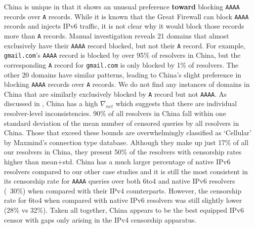 China is unique in that it shows an unusual preference \textbf{toward} blocking
\texttt{AAAA} records over \texttt{A} records. While it is known that the Great
Firewall can block \texttt{AAAA} records and injects IPv6 traffic, it is not
clear why it would block those records more than \texttt{A} records. Manual
investigation reveals 21 domains that almost exclusively have their
\texttt{AAAA} record blocked, but not their \texttt{A} record. For example,
\texttt{gmail.com}'s \texttt{AAAA} record is blocked by over 95\% of resolvers
in China, but the corresponding \texttt{A} record for \texttt{gmail.com} is
only blocked by 1\% of resolvers. The other 20 domains have similar patterns,
leading to China's slight preference in blocking \texttt{AAAA} records over
\texttt{A} records. We do not find any instances of domains in China that are
similarly exclusively blocked by \texttt{A} record but not \texttt{AAAA}.
%
As discussed in , China has a high
$\nabla_{net}$ which suggests that there are individual resolver-level
inconsistencies. 90\% of all resolvers in China fall within one standard
deviation of the mean number of censored queries by all resolvers in China.
Those that exceed these bounds are overwhelmingly classified as `Cellular' by
Maxmind's connection type database. Although they make up just 17\% of all our
resolvers in China, they present 50\% of the resolvers with censorship rates
higher than mean+std.
%
China has a much larger percentage of native IPv6 resolvers compared to our
other case studies and it is still the most consistent in its censorship rate
for \texttt{AAAA} queries over both 6to4 and native IPv6 resolvers (~30\%) when
compared with their IPv4 counterparts. However, the censorship rate for 6to4
when compared with native IPv6 resolvers was still slightly lower (28\% vs
32\%).
%
Taken all together, China appears to be the best equipped IPv6 censor with gaps
only arising in the IPv4 censorship apparatus.






